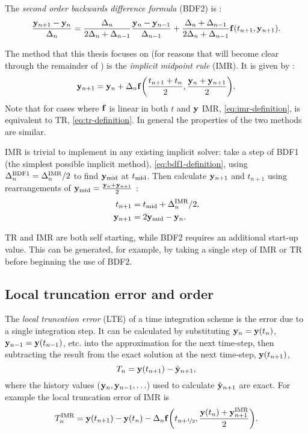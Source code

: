 The \emph{second order backwards difference formula} (BDF2) is \cite[715]{GreshoSani}:
\begin{equation}
  \frac{\mathbf{y}_{n+1} - \mathbf{y}_n}{\Delta_{n}} = \frac{\Delta_{n}}{2\Delta_{n} + \Delta_{n-1}} \frac{\mathbf{y}_n - \mathbf{y}_{n-1}}{\Delta_{n-1}} 
  + \frac{\Delta_{n} + \Delta_{n-1}}{2\Delta_{n} + \Delta_{n-1}} {\mathbf{f}}(t_{n+1}, \mathbf{y}_{n+1}).
\end{equation}

The method that this thesis focuses on (for reasons that will become clear through the remainder of ) is the \emph{implicit midpoint rule} (IMR).
It is given by \cite[263]{GreshoSani}:
\begin{equation}
  \label{eq:imr-definition}
  \mathbf{y}_{n+1} = \mathbf{y}_n + \Delta_{n} {\mathbf{f}{\left( \frac{t_{n+1} + t_n}{2}, \frac{\mathbf{y}_n + \mathbf{y}_{n+1}}{2} \right)}}.
\end{equation}
Note that for cases where ${\mathbf{f}}$ is linear in both $t$ and $\mathbf{y}$ IMR, \cref{eq:imr-definition}, is equivalent to TR, \cref{eq:tr-definition}.
In general the properties of the two methods are similar.

IMR is trivial to implement in any existing implicit solver: take a step of BDF1 (the simplest possible implicit method), \cref{eq:bdf1-definition}, using $\Delta_{n}^{\text{BDF1}} = \Delta_{n}^{\text{IMR}}/2$ to find $\mathbf{y}_{\text{mid}}$ at $t_{\text{mid}}$.
Then calculate $\mathbf{y}_{n+1}$ and $t_{n+1}$ using rearrangements of $\mathbf{y}_{\text{mid}} = \frac{\mathbf{y}_n + \mathbf{y}_{n+1}}{2}$ \cite{Malidi2005}:
\begin{equation}
  \begin{aligned}
    t_{n+1} &= t_{\text{mid}} + \Delta_{n}^{\text{IMR}}/2, \\
    \mathbf{y}_{n+1} &= 2\mathbf{y}_{\text{mid}} - \mathbf{y}_n.
  \end{aligned}
\end{equation}

TR and IMR are both self starting, while BDF2 requires an additional start-up value.
This can be generated, for example, by taking a single step of IMR or TR before beginning the use of BDF2.


\subsection{Local truncation error and order}
\label{sec:deriv-local-trunc}

The \emph{local truncation error} (LTE) of a time integration scheme is the error due to a single integration step.
It can be calculated by substituting $\mathbf{y}_n = \mathbf{y}(t_n)$, $\mathbf{y}_{n-1} = \mathbf{y}(t_{n-1})$, etc. into the approximation for the next time-step, then subtracting the result from the exact solution at the next time-step, $\mathbf{y}(t_{n+1})$, \ie
\begin{equation}
  \label{eq:60}
  T_n = \mathbf{y}(t_{n+1}) - \hat{\mathbf{y}}_{n+1},
\end{equation}
where the history values ($\mathbf{y}_{n}, \mathbf{y}_{n-1}, \ldots$) used to calculate $\hat{\mathbf{y}}_{n+1}$ are exact.
For example the local truncation error of IMR is
\begin{equation}
  T_n^{\text{IMR}} =  \mathbf{y}(t_{n+1}) - \mathbf{y}(t_n) - \Delta_{n} {\mathbf{f}{\left( t_{n+\nicefrac{1}{2}}, \frac{\mathbf{y}(t_n) + \mathbf{y}_{n+1}^{\text{IMR}}}{2} \right)}}.
  \label{eq:trunc-start}
\end{equation}

